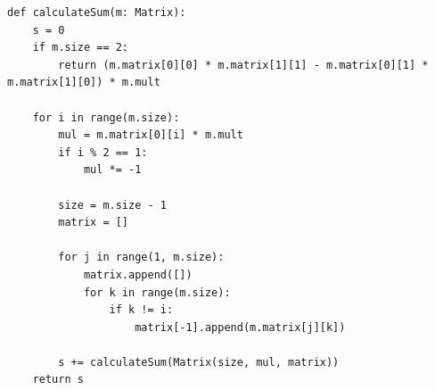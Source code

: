 \documentclass[12pt]{report}
\begin{document}
    \begin{lstlisting}[caption=Рекурсивный алгоритм, label={code:normal}]
        def calculateSum(m: Matrix):
    s = 0
    if m.size == 2:
        return (m.matrix[0][0] * m.matrix[1][1] - m.matrix[0][1] * m.matrix[1][0]) * m.mult

    for i in range(m.size):
        mul = m.matrix[0][i] * m.mult
        if i % 2 == 1:
            mul *= -1

        size = m.size - 1
        matrix = []

        for j in range(1, m.size):
            matrix.append([])
            for k in range(m.size):
                if k != i:
                    matrix[-1].append(m.matrix[j][k])

        s += calculateSum(Matrix(size, mul, matrix))
    return s
    \end{lstlisting}
\end{document}
